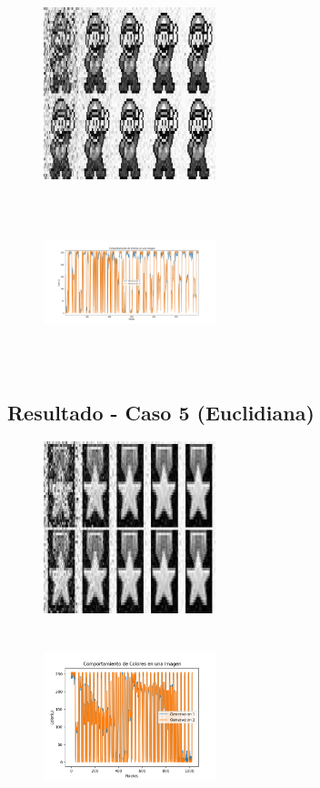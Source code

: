 \documentclass[letterpaper, 10 pt, conference]{ieeeconf}  %
\begin{document}
\begin{figure}[h]
\centering
\includegraphics[width=5cm, height=5cm]{Collage}
\end{figure}
\begin{figure}[h]
\centering
\includegraphics[width=5cm, height=5cm]{MejorGeneracion1}
\end{figure}
\subsection{\textbf{Resultado - Caso 5 (Euclidiana)}}

\begin{figure}[h]
\centering
\includegraphics[width=5cm, height=5cm]{Collage1}
\end{figure}
\begin{figure}[h]
\centering
\includegraphics[width=5cm, height=5cm]{MejorGeneracion5}
\end{figure}
\end{document}
